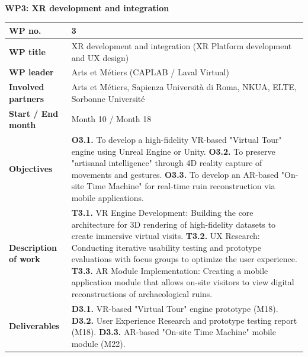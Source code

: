 \textbf{WP3: XR development and integration}
\begin{table}[H]
\centering
\small
\renewcommand{\arraystretch}{1.2}
\begin{tabularx}{\textwidth}{|l|X|}
\hline
\rowcolor{gray!10} \textbf{WP no.} & 3 \\ \hline
\textbf{WP title} & XR development and integration (XR Platform development and UX design) \\ \hline
\textbf{WP leader} & Arts et Métiers (CAPLAB / Laval Virtual)  \\ \hline
\textbf{Involved partners} & Arts et Métiers, Sapienza Università di Roma, NKUA, ELTE, Sorbonne Université  \\ \hline
\textbf{Start / End month} & Month 10 / Month 18 \\ \hline
\textbf{Objectives} & \textbf{O3.1.} To develop a high-fidelity VR-based "Virtual Tour" engine using Unreal Engine or Unity. \newline \textbf{O3.2.} To preserve "artisanal intelligence" through 4D reality capture of movements and gestures. \newline \textbf{O3.3.} To develop an AR-based "On-site Time Machine" for real-time ruin reconstruction via mobile applications. \\ \hline
\textbf{Description of work} & \textbf{T3.1.} VR Engine Development: Building the core architecture for 3D rendering of high-fidelity datasets to create immersive virtual visits. \newline \textbf{T3.2.} UX Research: Conducting iterative usability testing and prototype evaluations with focus groups to optimize the user experience. \newline \textbf{T3.3.} AR Module Implementation: Creating a mobile application module that allows on-site visitors to view digital reconstructions of archaeological ruins. \\ \hline
\textbf{Deliverables} & \textbf{D3.1.} VR-based "Virtual Tour" engine prototype (M18). \newline \textbf{D3.2.} User Experience Research and prototype testing report (M18). \newline \textbf{D3.3.} AR-based "On-site Time Machine" mobile module (M22). \\ \hline
\end{tabularx}
\end{table}